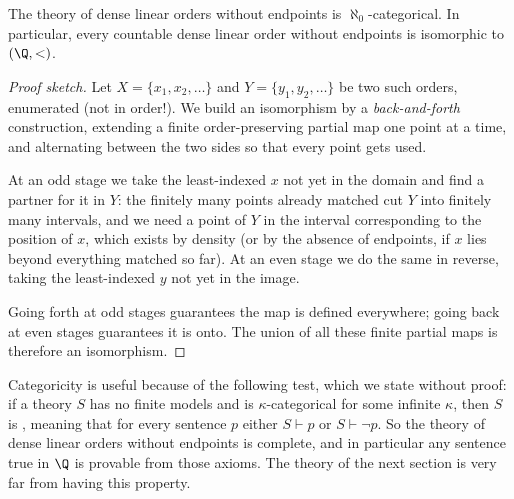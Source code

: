 \begin{theorem}[Cantor]
  The theory of dense linear orders without endpoints is $\aleph_0$-categorical. In particular, every countable dense linear order without endpoints is isomorphic to $(\Q, <)$.
\end{theorem}
\begin{proof}[Proof sketch]
  Let $X = \{x_1, x_2, \dots\}$ and $Y = \{y_1, y_2, \dots\}$ be two such orders, enumerated (not in order!). We build an isomorphism by a \emph{back-and-forth} construction, extending a finite order-preserving partial map one point at a time, and alternating between the two sides so that every point gets used.

  At an odd stage we take the least-indexed $x$ not yet in the domain and find a partner for it in $Y$: the finitely many points already matched cut $Y$ into finitely many intervals, and we need a point of $Y$ in the interval corresponding to the position of $x$, which exists by density (or by the absence of endpoints, if $x$ lies beyond everything matched so far). At an even stage we do the same in reverse, taking the least-indexed $y$ not yet in the image.
  \begin{center}
  \end{center}
  Going forth at odd stages guarantees the map is defined everywhere; going back at even stages guarantees it is onto. The union of all these finite partial maps is therefore an isomorphism.
\end{proof}

Categoricity is useful because of the following test, which we state without proof: if a theory $S$ has no finite models and is $\kappa$-categorical for some infinite $\kappa$, then $S$ is , meaning that for every sentence $p$ either $S \vdash p$ or $S \vdash \lnot p$. So the theory of dense linear orders without endpoints is complete, and in particular any sentence true in $\Q$ is provable from those axioms. The theory of the next section is very far from having this property.

